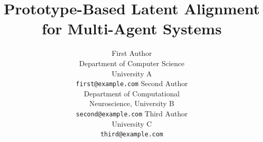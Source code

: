 \documentclass[11pt]{article}
\title{Prototype-Based Latent Alignment for Multi-Agent Systems}
\author{
  First Author \\
  Department of Computer Science \\
  University A \\
  \texttt{first@example.com}
  \And
  Second Author \\
  Department of Computational \\
  Neuroscience, University B \\
  \texttt{second@example.com}
  \AND
  Third Author \\
  University C \\
  \texttt{third@example.com}
}
\begin{document}
\maketitle

\end{document}
